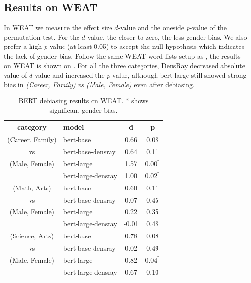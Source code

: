 \subsection{Results on WEAT}
In WEAT we measure the effect size $d$-value and the oneside $p$-value of the permutation test. For the $d$-value, the closer to zero, the less gender bias.  We also prefer a high $p$-value (at least 0.05) to accept the null hypothesis which indicates the lack of gender bias. Follow the same WEAT word lists setup as \citet{karve2019conceptor}, the results on WEAT is shown on . For all the three categories, DensRay decreased absolute value of $d$-value and increased the $p$-value, although bert-large still showed strong bias in \textit{(Career, Family) vs (Male, Female)} even after debiasing.
\begin{table}[ht]
\centering
\footnotesize
\begin{tabular}{clcc}
\hline
category & model & d & p\\
\hline
(Career, Family) & bert-base & 0.66 & 0.08 \\
vs& bert-base-densray & 0.64 & 0.11\\
(Male, Female)& bert-large & 1.57 & $0.00^{*}$ \\
& bert-large-densray & 1.00 & $0.02^{*}$\\
\hline
(Math, Arts) & bert-base & 0.60 & 0.11 \\
vs& bert-base-densray & 0.07 & 0.45\\
(Male, Female)& bert-large & 0.22 & 0.35 \\
& bert-large-densray & -0.01 & 0.48\\
\hline
(Science, Arts)& bert-base & 0.78 & 0.08 \\
vs& bert-base-densray & 0.02 & 0.49\\
(Male, Female) & bert-large & 0.82 & $0.04^{*}$  \\
& bert-large-densray & 0.67 & 0.10\\
\hline
\end{tabular}
\caption{
BERT debiasing results on WEAT. * shows significant gender bias.}
\end{table}
